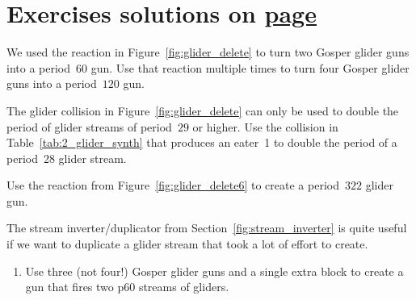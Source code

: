 \section*{Exercises \hfill \normalfont\textsf{\small solutions on \hyperlink{solutions_glider_guns}{page \pageref{solutions_glider_guns}}}}
\label{sec:guns_exercises}
\vspace*{-0.4cm}\hrulefill\vspace*{-0.3cm}\footnotesize\begin{multicols}{2}\vspace*{-0.4cm}\raggedcolumns{}
\setlength{\parskip}{0pt}

\begin{problem}\label{exer:gun_double_again}
	We used the reaction in Figure~\ref{fig:glider_delete} to turn two Gosper glider guns into a period~$60$ gun. Use that reaction multiple times to turn four Gosper glider guns into a period~$120$ gun.
\end{problem}


\mfilbreak


\begin{problem}\label{exer:p28_double}
	The glider collision in Figure~\ref{fig:glider_delete} can only be used to double the period of glider streams of period~$29$ or higher. Use the collision in Table~\ref{tab:2_glider_synth} that produces an eater~1 to double the period of a period~28 glider stream.
\end{problem}


\mfilbreak


\begin{problem}\label{exer:p322_gun}
	Use the reaction from Figure~\ref{fig:glider_delete6} to create a period~$322$ glider gun.
\end{problem}


\mfilbreak


\begin{problem}\label{exer:duplicate_doubled_stream}
	The stream inverter/duplicator from Section~\ref{fig:stream_inverter} is quite useful if we want to duplicate a glider stream that took a lot of effort to create.\smallskip
	
	\begin{enumerate}[label=\bf\color{ocre}(\alph*)]
		\item Use three (not four!) Gosper glider guns and a single extra block to create a gun that fires two p$60$ streams of gliders.
		

\end{enumerate}
\end{problem}
\end{multicols}
